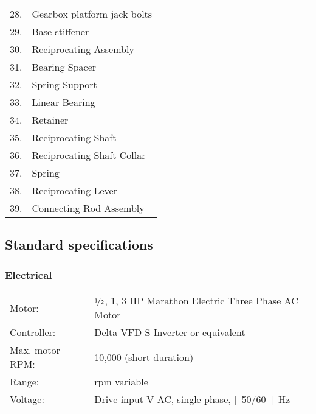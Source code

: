 \documentclass[a4paper,11pt]{report}
\begin{document}
\begin{tabular}{rl}
28. & Gearbox platform jack bolts\\
29. & Base stiffener\\
30. & Reciprocating Assembly\\
31. & Bearing Spacer \\
32. & Spring Support \\
33. & Linear Bearing\\
34. & Retainer\\
35. & Reciprocating Shaft\\
36. & Reciprocating Shaft Collar \\
37. & Spring\\
38. & Reciprocating Lever\\
39. & Connecting Rod Assembly
\end{tabular}

\subsection{Standard specifications}
\subsubsection{Electrical}
\begin{tabular}{ll}
Motor: &  $\nicefrac{1}{2}$, 1, 3 HP Marathon Electric Three Phase AC Motor\\
Controller:& Delta VFD-S Inverter or equivalent\\
Max. motor RPM:& 10,000 (short duration)\\
Range:& \unit[0 to 10,000]{rpm} variable\\
Voltage:& Drive input \unit[120 or 230]{V} AC, single phase, \unit[50/60]{Hz}\\
\end{tabular}
\end{document}
